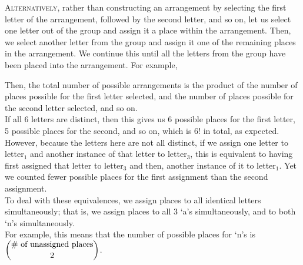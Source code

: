 \documentclass{article}
\begin{document}
\textsc{Alternatively,} rather than constructing an arrangement by selecting the first letter of the arrangement, followed by the second letter, and so on, let us select one letter out of the group and assign it a place within the arrangement. Then, we select another letter from the group and assign it one of the remaining places in the arrangement. We continue this until all the letters from the group have been placed into the arrangement. For example,
\begin{center}
\end{center}
Then, the total number of possible arrangements is the product of the number of places possible for the first letter selected, and the number of places possible for the second letter selected, and so on.\\[1ex]
If all 6 letters are distinct, then this gives us 6 possible places for the first letter, 5 possible places for the second, and so on, which is $6!$ in total, as expected.\\[1ex]
However, because the letters here are not all distinct, if we assign one letter to letter$_1$ and another instance of that letter to letter$_3$, this is equivalent to having first assigned that letter to letter$_3$ and then, another instance of it to letter$_1$. Yet we counted fewer possible places for the first assignment than the second assignment.\\[1ex]
To deal with these equivalences, we assign places to all identical letters simultaneously; that is, we assign places to all 3 `a's simultaneously, and to both `n's simultaneously.\\[1ex]
For example, this means that the number of possible places for `n's is $\dbinom{\text{\# of unassigned places}}{2}$.\\
\end{document}

